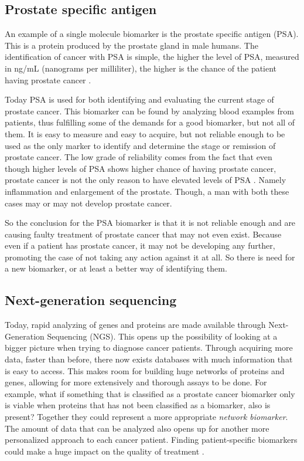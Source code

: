 \documentclass[UKenglish,11pt,a4paper]{article}
\begin{document}
\subsection{Prostate specific antigen}
An example of a single molecule biomarker is the prostate specific antigen (PSA). This is a protein produced by the 
prostate gland in male humans. The identification of cancer with PSA is simple, the higher the level of PSA, measured in
ng/mL (nanograms per milliliter), the higher is the chance of the patient having prostate cancer \cite{cancerfacts}.

Today PSA is used for both identifying and evaluating the current stage of prostate cancer. This biomarker can be found 
by analyzing blood examples from patients, thus fulfilling some of the demands for a good biomarker,
but not all of them. It is easy to measure and easy to acquire, but not reliable enough to be used as the only marker
to identify and determine the stage or remission of prostate cancer. The low grade of reliability comes from the fact
that even though higher levels of PSA shows higher chance of having prostate cancer, prostate cancer is not the only
reason to have elevated levels of PSA \cite{cancerfacts}.
Namely inflammation and enlargement of the prostate. Though, a man with both these cases may or may not develop prostate
cancer.




So the conclusion for the PSA biomarker is that it is not reliable enough and are causing faulty treatment of prostate
cancer that may not even exist. Because even if a patient has prostate cancer, it may not be developing any further, 
promoting the case of not taking any action against it at all. So there is need for a new biomarker, or at least a 
better way of identifying them.

\subsection{Next-generation sequencing}
Today, rapid analyzing of genes and proteins are made available through Next-Generation Sequencing (NGS)\cite{ngs1}.
This opens up the possibility of looking at a bigger picture when trying to diagnose cancer patients. Through acquiring
more data, faster than before, there now exists databases with much information that is easy to access. This makes room
for building huge networks of proteins and genes, allowing for more extensively and thorough assays to be done. For
example, what if something that is classified as a prostate cancer biomarker only is viable when proteins that has not
been classified as a biomarker, also is present? Together they could represent a more appropriate
\emph{network biomarker}.
The amount of data that can be analyzed also opens up for another more personalized approach to each cancer patient.
Finding patient-specific biomarkers could make a huge impact on the quality of treatment \cite{personalized}.
\end{document}
